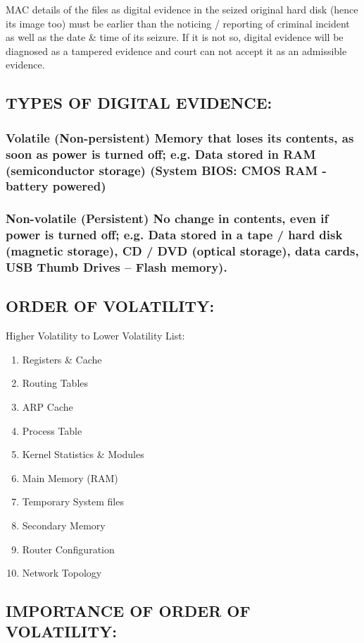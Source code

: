 \documentclass[10pt,british,english]{article}
\begin{document}
MAC details of the files as digital evidence in the seized original
hard disk (hence its image too) must be earlier than the noticing
/ reporting of criminal incident as well as the date \& time of its
seizure. If it is not so, digital evidence will be diagnosed as a
tampered evidence and court can not accept it as an admissible evidence. 

\subsection{TYPES OF DIGITAL EVIDENCE:}

\subsubsection{Volatile (Non-persistent) Memory that loses its contents, as soon
as power is turned off; e.g. Data stored in RAM (semiconductor storage)
(System BIOS: CMOS RAM - battery powered) }

\subsubsection{Non-volatile (Persistent) No change in contents, even if power is
turned off; e.g. Data stored in a tape / hard disk (magnetic storage),
CD / DVD (optical storage), data cards, USB Thumb Drives -- Flash
memory). }

\subsection{ORDER OF VOLATILITY:}

Higher Volatility to Lower Volatility List:
\begin{enumerate}
\item Registers \& Cache
\item Routing Tables
\item ARP Cache
\item Process Table
\item Kernel Statistics \& Modules 
\item Main Memory (RAM)
\item Temporary System files
\item Secondary Memory
\item Router Configuration
\item Network Topology 
\end{enumerate}

\subsection{IMPORTANCE OF ORDER OF VOLATILITY:}
\end{document}
